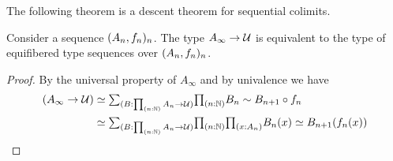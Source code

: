 The following theorem is a descent theorem for sequential colimits.

\begin{thm}\label{thm:sequential_descent}
Consider a sequence $({A}_{n},{f}_{n})_{n}$. The type $A_\infty\to\mathcal{U}$ is equivalent to the type of equifibered type sequences over $({A}_{n},{f}_{n})_{n}$.
\end{thm}

\begin{proof}
By the universal property of $A_\infty$ and by univalence we have
\begin{align*}
(A_\infty\to \UU) & \eqvsym \sm{B:\prd{n:\N}A_n\to \UU}\prd{n:\N} B_n\htpy B_{n+1}\circ f_n \\
& \eqvsym \sm{B:\prd{n:\N}A_n\to \UU}\prd{n:\N}{x:A_n} B_n(x)\eqvsym B_{n+1}(f_n(x))\qedhere
\end{align*}
\end{proof}

